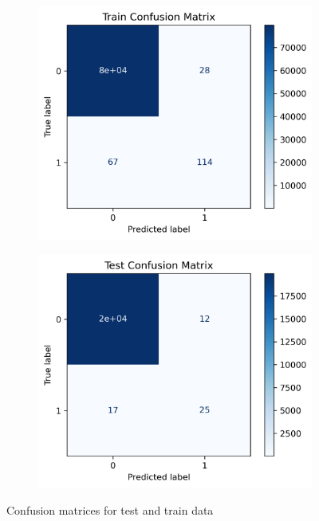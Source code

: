 \documentclass[utf8x]{ctexart}
\begin{document}
\begin{figure}[htb]
  \centering
  \begin{subfigure}[b]{0.48\textwidth}
    \centering
    \includegraphics[width=\textwidth]{./images/net(d4_k8)_E50_LR0.0001_B64/conf_train.png}
    \label{fig:confusion_train}
  \end{subfigure}
  \begin{subfigure}[b]{0.48\textwidth}
    \centering
    \includegraphics[width=\textwidth]{./images/net(d4_k8)_E50_LR0.0001_B64/conf_test.png}
    \label{fig:confusion_test}
  \end{subfigure}
  \caption{Confusion matrices for test and train data}
  \label{fig:confusion_matrices}
\end{figure}
\end{document}
